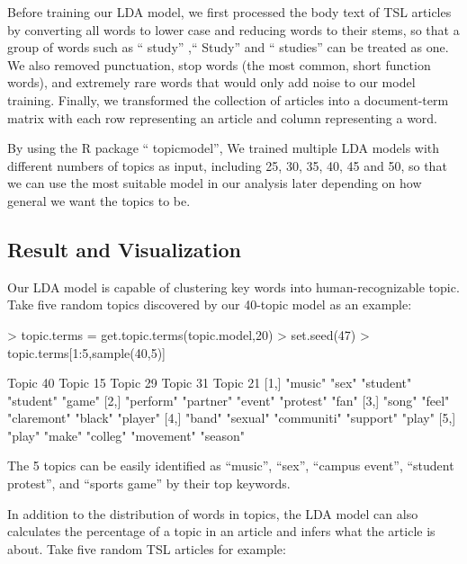 \documentclass[a4paper]{article}
\begin{document}
Before training our LDA model, we first processed the body text of TSL articles by converting all words to lower case and reducing words to their stems, so that a group of words such as `` study'' ,`` Study''  and `` studies''  can be treated as one. We also removed punctuation, stop words (the most common, short function words), and extremely rare words that would only add noise to our model training. Finally, we transformed the collection of articles into a document-term matrix with each row representing an article and column representing a word. 

By using the R package `` topicmodel'', We trained multiple LDA models with different numbers of topics as input, including 25, 30, 35, 40, 45 and 50, so that we can use the most suitable model in our analysis later depending on how general we want the topics to be.

\subsection{Result and Visualization}

Our LDA model is capable of clustering key words into human-recognizable topic. Take five random topics discovered by our 40-topic model as an example:

\begin{Schunk}
\begin{Sinput}
> topic.terms = get.topic.terms(topic.model,20)
> set.seed(47)
> topic.terms[1:5,sample(40,5)]
\end{Sinput}
\begin{Soutput}
     Topic 40  Topic 15  Topic 29    Topic 31   Topic 21
[1,] "music"   "sex"     "student"   "student"  "game"  
[2,] "perform" "partner" "event"     "protest"  "fan"   
[3,] "song"    "feel"    "claremont" "black"    "player"
[4,] "band"    "sexual"  "communiti" "support"  "play"  
[5,] "play"    "make"    "colleg"    "movement" "season"
\end{Soutput}
\end{Schunk}

The 5 topics can be easily identified as ``music'', ``sex'', ``campus event'', ``student protest'', and ``sports game'' by their top keywords.

In addition to the distribution of words in topics, the LDA model can also calculates the percentage of a topic in an article and infers what the article is about. Take five random TSL articles for example:
\end{document}
